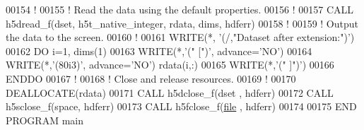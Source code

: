 \begin{DoxyCode}
00154   \textcolor{comment}{!}
00155   \textcolor{comment}{! Read the data using the default properties.}
00156   \textcolor{comment}{!}
00157   \textcolor{keyword}{CALL }h5dread\_f(dset, h5t\_native\_integer, rdata, dims, hdferr)
00158   \textcolor{comment}{!}
00159   \textcolor{comment}{! Output the data to the screen.}
00160   \textcolor{comment}{!}
00161   \textcolor{keyword}{WRITE}(*, \textcolor{stringliteral}{'(/,"Dataset after extension:")'})
00162   \textcolor{keywordflow}{DO} i=1, dims(1)
00163      \textcolor{keyword}{WRITE}(*,\textcolor{stringliteral}{'(" [")'}, advance=\textcolor{stringliteral}{'NO'})
00164      \textcolor{keyword}{WRITE}(*,\textcolor{stringliteral}{'(80i3)'}, advance=\textcolor{stringliteral}{'NO'}) rdata(i,:)
00165      \textcolor{keyword}{WRITE}(*,\textcolor{stringliteral}{'(" ]")'})
00166 \textcolor{keywordflow}{  ENDDO}
00167   \textcolor{comment}{!}
00168   \textcolor{comment}{! Close and release resources.}
00169   \textcolor{comment}{!}
00170   \textcolor{keyword}{DEALLOCATE}(rdata)
00171   \textcolor{keyword}{CALL }h5dclose\_f(dset , hdferr)
00172   \textcolor{keyword}{CALL }h5sclose\_f(space, hdferr)
00173   \textcolor{keyword}{CALL }h5fclose\_f(\hyperlink{structfile}{file} , hdferr)
00174 
00175 \textcolor{keyword}{END PROGRAM }main
\end{DoxyCode}
